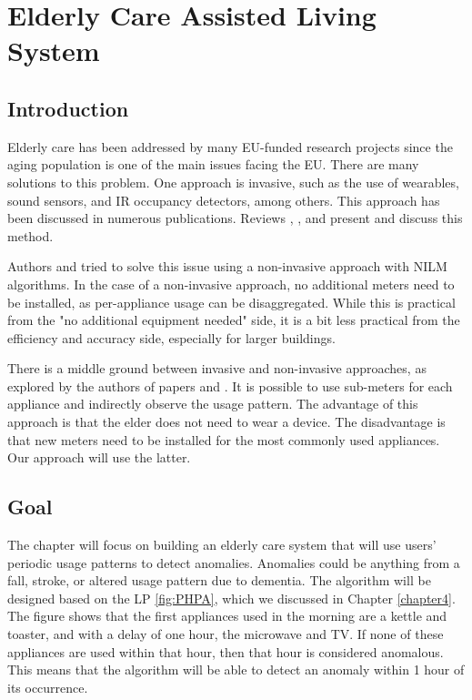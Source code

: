 \chapter{Elderly Care Assisted Living System} %

\label{chapter6} %


\section{Introduction}


Elderly care has been addressed by many EU-funded research projects since the aging population is one of the main issues facing the EU. 
There are many solutions to this problem.
One approach is invasive, such as the use of wearables, sound sensors, and IR occupancy detectors, among others.
This approach has been discussed in numerous publications.
Reviews \cite{elderReview1}, \cite{elderReview2}, and \cite{elderReview3} present and discuss this method.

Authors \cite{elderNILM} and \cite{elderNILMDementia} tried to solve this issue using a non-invasive approach with NILM algorithms. 
In the case of a non-invasive approach, no additional meters need to be installed, as per-appliance usage can be disaggregated.
While this is practical from the "no additional equipment needed" side, it is a bit less practical from the efficiency and accuracy side, especially for larger buildings. 

There is a middle ground between invasive and non-invasive approaches, as explored by the authors of papers \cite{elder1} and \cite{elder2}. 
It is possible to use sub-meters for each appliance and indirectly observe the usage pattern. 
The advantage of this approach is that the elder does not need to wear a device. 
The disadvantage is that new meters need to be installed for the most commonly used appliances. 
Our approach will use the latter.

\section{Goal}

The chapter will focus on building an elderly care system that will use users' periodic usage patterns to detect anomalies.
Anomalies could be anything from a fall, stroke, or altered usage pattern due to dementia. 
The algorithm will be designed based on the LP \ref{fig:PHPA}, which we discussed in Chapter \ref{chapter4}.
The figure shows that the first appliances used in the morning are a kettle and toaster, and with a delay of one hour, the microwave and TV. 
If none of these appliances are used within that hour, then that hour is considered anomalous.
This means that the algorithm will be able to detect an anomaly within 1 hour of its occurrence.

